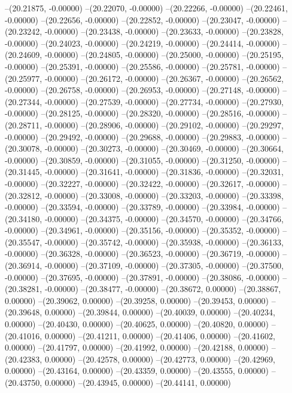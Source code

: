 --(20.21875, -0.00000)
--(20.22070, -0.00000)
--(20.22266, -0.00000)
--(20.22461, -0.00000)
--(20.22656, -0.00000)
--(20.22852, -0.00000)
--(20.23047, -0.00000)
--(20.23242, -0.00000)
--(20.23438, -0.00000)
--(20.23633, -0.00000)
--(20.23828, -0.00000)
--(20.24023, -0.00000)
--(20.24219, -0.00000)
--(20.24414, -0.00000)
--(20.24609, -0.00000)
--(20.24805, -0.00000)
--(20.25000, -0.00000)
--(20.25195, -0.00000)
--(20.25391, -0.00000)
--(20.25586, -0.00000)
--(20.25781, -0.00000)
--(20.25977, -0.00000)
--(20.26172, -0.00000)
--(20.26367, -0.00000)
--(20.26562, -0.00000)
--(20.26758, -0.00000)
--(20.26953, -0.00000)
--(20.27148, -0.00000)
--(20.27344, -0.00000)
--(20.27539, -0.00000)
--(20.27734, -0.00000)
--(20.27930, -0.00000)
--(20.28125, -0.00000)
--(20.28320, -0.00000)
--(20.28516, -0.00000)
--(20.28711, -0.00000)
--(20.28906, -0.00000)
--(20.29102, -0.00000)
--(20.29297, -0.00000)
--(20.29492, -0.00000)
--(20.29688, -0.00000)
--(20.29883, -0.00000)
--(20.30078, -0.00000)
--(20.30273, -0.00000)
--(20.30469, -0.00000)
--(20.30664, -0.00000)
--(20.30859, -0.00000)
--(20.31055, -0.00000)
--(20.31250, -0.00000)
--(20.31445, -0.00000)
--(20.31641, -0.00000)
--(20.31836, -0.00000)
--(20.32031, -0.00000)
--(20.32227, -0.00000)
--(20.32422, -0.00000)
--(20.32617, -0.00000)
--(20.32812, -0.00000)
--(20.33008, -0.00000)
--(20.33203, -0.00000)
--(20.33398, -0.00000)
--(20.33594, -0.00000)
--(20.33789, -0.00000)
--(20.33984, -0.00000)
--(20.34180, -0.00000)
--(20.34375, -0.00000)
--(20.34570, -0.00000)
--(20.34766, -0.00000)
--(20.34961, -0.00000)
--(20.35156, -0.00000)
--(20.35352, -0.00000)
--(20.35547, -0.00000)
--(20.35742, -0.00000)
--(20.35938, -0.00000)
--(20.36133, -0.00000)
--(20.36328, -0.00000)
--(20.36523, -0.00000)
--(20.36719, -0.00000)
--(20.36914, -0.00000)
--(20.37109, -0.00000)
--(20.37305, -0.00000)
--(20.37500, -0.00000)
--(20.37695, -0.00000)
--(20.37891, -0.00000)
--(20.38086, -0.00000)
--(20.38281, -0.00000)
--(20.38477, -0.00000)
--(20.38672, 0.00000)
--(20.38867, 0.00000)
--(20.39062, 0.00000)
--(20.39258, 0.00000)
--(20.39453, 0.00000)
--(20.39648, 0.00000)
--(20.39844, 0.00000)
--(20.40039, 0.00000)
--(20.40234, 0.00000)
--(20.40430, 0.00000)
--(20.40625, 0.00000)
--(20.40820, 0.00000)
--(20.41016, 0.00000)
--(20.41211, 0.00000)
--(20.41406, 0.00000)
--(20.41602, 0.00000)
--(20.41797, 0.00000)
--(20.41992, 0.00000)
--(20.42188, 0.00000)
--(20.42383, 0.00000)
--(20.42578, 0.00000)
--(20.42773, 0.00000)
--(20.42969, 0.00000)
--(20.43164, 0.00000)
--(20.43359, 0.00000)
--(20.43555, 0.00000)
--(20.43750, 0.00000)
--(20.43945, 0.00000)
--(20.44141, 0.00000)
